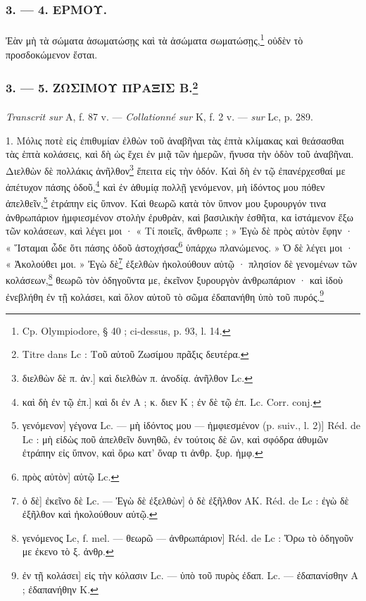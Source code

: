 \documentclass[landscape, a4paper, 11pt, oneside, polutonikogreek, french]{article}
\begin{document}
\bigskip
\centerline{\EightStarTaper}
\centerline{\EightStarTaper\EightStarTaper}
\bigskip

\subsubsection{3. --- 4. ΕΡΜΟΥ.}
\paragraph{}
Ἐὰν μὴ τὰ σώματα ἀσωματώσῃς καὶ τὰ ἀσώματα σωματώσῃς,\footnote{Cp. Olympiodore, § 40 ; ci-dessus, p. 93, l. 14.} οὐδὲν τὸ προσδοκώμενον ἔσται.

\bigskip
\centerline{\EightStarTaper}
\centerline{\EightStarTaper\EightStarTaper}
\bigskip

\subsubsection[3. --- 5. ΖΩΣΙΜΟΥ ΠΡΑΞΙΣ Β.]{3. --- 5. ΖΩΣΙΜΟΥ ΠΡΑΞΙΣ Β.\footnote{Titre dans Lc : Τοῦ αὐτοῦ Ζωσίμου πρᾶξις δευτέρα.}}
\paragraph{}
\emph{Transcrit sur} A, f. 87 v. --- \emph{Collationné sur} K, f. 2 v. --- \emph{sur} Lc, p. 289.

\bigskip

1. Μόλις ποτὲ εἰς ἐπιθυμίαν ἐλθὼν τοῦ ἀναβῆναι τὰς ἑπτὰ κλίμακας καὶ θεάσασθαι τὰς ἑπτὰ κολάσεις, καὶ δὴ ὡς ἔχει ἐν μιᾷ τῶν ἡμερῶν, ἤνυσα τὴν ὁδὸν τοῦ ἀναβῆναι. Διελθὼν δὲ πολλάκις ἀνῆλθον\footnote{διελθὼν δὲ π. ἀν.] καὶ διελθὼν π. ἀνοδίᾳ. ἀνῆλθον Lc.} ἔπειτα εἰς τὴν ὁδόν. Καὶ δὴ ἐν τῷ ἐπανέρχεσθαί με ἀπέτυχον πάσης ὁδοῦ,\footnote{καὶ δὴ ἐν τῷ ἐπ.] καὶ δι ἐν A ; κ. διεν K ; ἐν δὲ τῷ ἐπ. Lc. Corr. conj.} καὶ ἐν ἀθυμίᾳ πολλῇ γενόμενον, μὴ ἰδόντος μου πόθεν ἀπελθεῖν,\footnote{γενόμενον] γέγονα Lc. --- μὴ ἰδόντος μου --- ἠμφιεσμένον (p. suiv., l. 2)] Réd. de Lc : μὴ εἰδὼς ποῦ ἀπελθεῖν δυνηθῶ, ἐν τούτοις δὲ ὢν, καὶ σφόδρα ἀθυμῶν ἐτράπην εἰς ὕπνον, καὶ ὅρω κατ' ὄναρ τι ἀνθρ. ξυρ. ἠμφ.} ἐτράπην εἰς ὕπνον. Καὶ θεωρῶ κατὰ τὸν ὕπνον μου ξυρουργόν τινα ἀνθρωπάριον ἠμφιεσμένον στολὴν ἐρυθρὰν, καὶ βασιλικὴν ἐσθῆτα, κα ἱστάμενον ἔξω τῶν κολάσεων, καὶ λέγει μοι · « Τί ποιεῖς, ἄνθρωπε ; » Ἐγὼ δὲ πρὸς αὐτὸν ἔφην · « Ἵσταμαι ὧδε ὅτι πάσης ὁδοῦ ἀστοχήσας\footnote{πρὸς αὐτὸν] αὐτῷ Lc.} ὑπάρχω πλανώμενος. » Ὁ δὲ λέγει μοι · « Ἀκολούθει μοι. » Ἐγὼ δὲ\footnote{ὁ δὲ] ἐκεῖνο δὲ Lc. --- Ἐγὼ δὲ ἐξελθὼν] ὁ δὲ ἐξῆλθον AK. Réd. de Lc : ἐγὼ δὲ ἐξῆλθον καὶ ἠκολούθουν αὐτῷ.} ἐξελθὼν ἠκολούθουν αὐτῷ · πλησίον δὲ γενομένων τῶν κολάσεων,\footnote{γενόμενος Lc, f. mel. --- θεωρῶ --- ἀνθρωπάριον] Réd. de Lc : Ὅρω τὸ ὁδηγοῦν με ἐκενο τὸ ξ. ἀνθρ.} θεωρῶ τὸν ὁδηγοῦντα με, ἐκεῖνον ξυρουργὸν ἀνθρωπάριον · καὶ ἰδοὺ ἐνεβλήθη ἐν τῇ κολάσει, καὶ ὅλον αὐτοῦ τὸ σῶμα ἐδαπανήθη ὑπὸ τοῦ πυρός.\footnote{ἐν τῇ κολάσει] εἰς τὴν κόλασιν Lc. --- ὑπὸ τοῦ πυρὸς ἐδαπ. Lc. --- ἐδαπανίσθην A ; ἐδαπανήθην K.}
\end{document}
